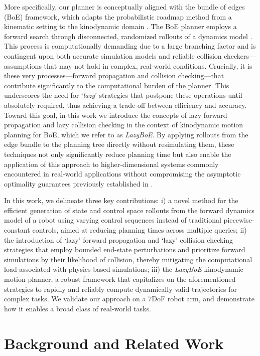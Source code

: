 More specifically, our planner is conceptually aligned with the bundle of edges (BoE) framework, which adapts the probabilistic roadmap method from a kinematic setting to the kinodynamic domain \cite{kavraki1996probabilistic}.
The BoE planner employs a forward search through disconnected, randomized rollouts of a dynamics model \cite{shome2021asymptotically}. This process is computationally demanding due to a large branching factor and is contingent upon both accurate simulation models and reliable collision checkers---assumptions that may not hold in complex, real-world conditions.
Crucially, it is these very processes---forward propagation and collision checking---that contribute significantly to the computational burden of the planner. This underscores the need for `\textsl{lazy}' strategies that postpone these operations until absolutely required, thus achieving a trade-off between efficiency and accuracy.
Toward this goal, in this work we introduce the concepts of lazy forward propagation and lazy collision checking in the context of kinodynamic motion planning for BoE, which we refer to as \textsl{LazyBoE}.
By applying rollouts from the edge bundle to the planning tree directly without resimulating them, these techniques not only significantly reduce planning time but also enable the application of this approach to higher-dimensional systems commonly encountered in real-world applications without compromising the asymptotic optimality guarantees previously established in \cite{shome2021asymptotically}.

In this work, we delineate three key contributions: i) a novel method for the efficient generation of state and control space rollouts from the forward dynamics model of a robot using varying control sequences instead of traditional piecewise-constant controls, aimed at reducing planning times across multiple queries; ii) the introduction of `lazy' forward propagation and `lazy' collision checking strategies that employ bounded end-state perturbations and prioritize forward simulations by their likelihood of collision, thereby mitigating the computational load associated with physics-based simulations; iii) the \textsl{LazyBoE} kinodynamic motion planner, a robust framework that capitalizes on the aforementioned strategies to rapidly and reliably compute dynamically valid trajectories for complex tasks. We validate our approach on a 7DoF robot arm, and demonstrate how it enables a broad class of real-world tasks.

\section{Background and Related Work}
\label{lazy:sec:background}

